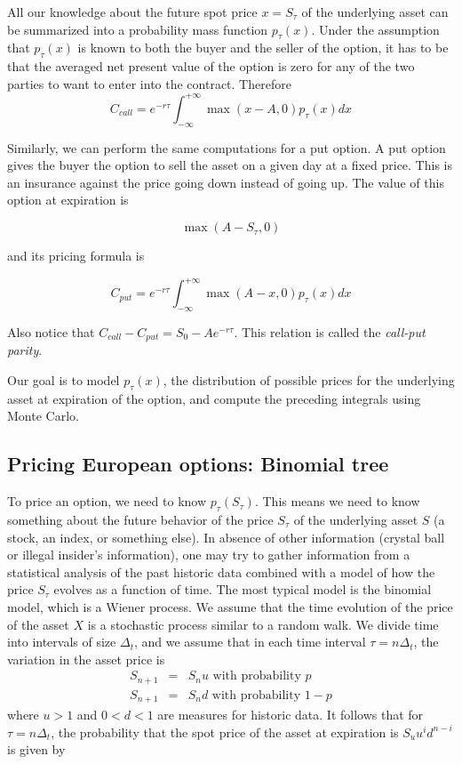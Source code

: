 \documentclass[justified,sixbynine]{tufte-book}
\theoremstyle{plain}%
\theoremstyle{definition}
\theoremstyle{remark}
\begin{document}
\begin{fullwidth}
All our knowledge about the future spot price $x=S_\tau $ of the underlying
asset can be summarized into a probability mass function $p_\tau (x)$. Under
the assumption that $p_\tau (x)$ is known to both the buyer and the seller
of the option, it has to be that the averaged net present value of the
option is zero for any of the two parties to want to enter into the contract.
Therefore
\begin{equation}
C_{call}=e^{-r\tau }\int_{-\infty }^{+\infty }\max (x-A,0)p_\tau (x)dx
\label{call_option}
\end{equation}


Similarly, we can perform the same computations for a put option. A put option gives the buyer the option to sell the asset on a given day at a fixed price. This is an insurance against the price going down instead of going up. The value of this option at expiration is

\begin{equation}
\max (A-S_\tau,0)
\end{equation}

and its pricing formula is

\begin{equation}
C_{put}=e^{-r\tau }\int_{-\infty }^{+\infty }\max (A-x,0)p_\tau (x)dx
\label{put_option}
\end{equation}

Also notice that $C_{call}-C_{put} = S_0 - A e^{-r\tau }$.
This relation is called the {\it call-put parity}.

Our goal is to model $p_\tau(x)$, the distribution of possible prices for the underlying asset at expiration of the option, and compute the preceding integrals using Monte Carlo.

\goodbreak\subsection{Pricing European options: Binomial tree}

To price an option, we need to know $p_\tau (S_\tau )$. This means we need to
know something about the future behavior of the price $S_\tau $ of the
underlying asset $S$ (a stock, an index, or something else). In absence of
other information (crystal ball or illegal insider's information), one may
try to gather information from a statistical analysis of the past historic
data combined with a model of how the price $S_\tau $ evolves as a function of
time. The most typical model is the binomial model, which is a Wiener
process. We assume that the time evolution of the price of the asset $X$ is a
stochastic process similar to a random walk. We divide time into
intervals of size $\Delta _t$, and we assume that in each time interval $\tau
=n\Delta _t$, the variation in the asset price is
\begin{eqnarray}
S_{n+1} &=&S_nu\text{ with probability }p \\
S_{n+1} &=&S_nd\text{ with probability }1-p
\end{eqnarray}
where $u>1$ and $0<d<1$ are measures for historic data. It follows that for $%
\tau =n\Delta _t$, the probability that the spot price of the asset at
expiration is $S_uu^id^{n-i}$ is given by


\end{fullwidth}
\end{document}
